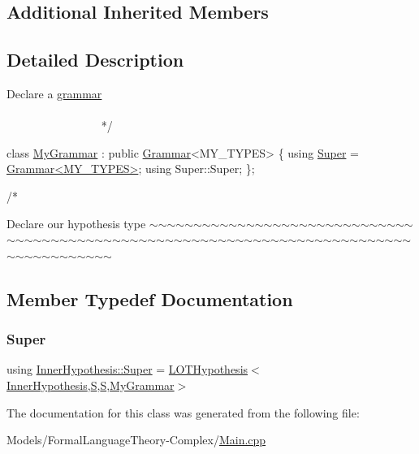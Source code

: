 \subsection*{Additional Inherited Members}


\subsection{Detailed Description}

\begin{DoxyCode}
    Declare a \hyperlink{class_l_o_t_hypothesis_affae32db28c39df676809ae47e14e7cf}{grammar}
   ~~~~~~~~~~~~~~~~~~~~~~~~~~~~~~~~~~~~~~~~~~~~~~~~~~~~~~~~~~~~~~~~~~~~~~~~~~~~~~~~~~~~~~~~ */



\textcolor{keyword}{class }\hyperlink{class_my_grammar}{MyGrammar} : \textcolor{keyword}{public} \hyperlink{class_grammar}{Grammar}<MY\_TYPES> \{
    \textcolor{keyword}{using} \hyperlink{class_inner_hypothesis_a1a69a8dd433b64b725be0b2436d6df0c}{Super} = \hyperlink{class_grammar}{Grammar<MY\_TYPES>};
    \textcolor{keyword}{using} Super::Super;
\};

\textcolor{comment}{/*}
\end{DoxyCode}
 Declare our hypothesis type $\sim$$\sim$$\sim$$\sim$$\sim$$\sim$$\sim$$\sim$$\sim$$\sim$$\sim$$\sim$$\sim$$\sim$$\sim$$\sim$$\sim$$\sim$$\sim$$\sim$$\sim$$\sim$$\sim$$\sim$$\sim$$\sim$$\sim$$\sim$$\sim$$\sim$$\sim$$\sim$$\sim$$\sim$$\sim$$\sim$$\sim$$\sim$$\sim$$\sim$$\sim$$\sim$$\sim$$\sim$$\sim$$\sim$$\sim$$\sim$$\sim$$\sim$$\sim$$\sim$$\sim$$\sim$$\sim$$\sim$$\sim$$\sim$$\sim$$\sim$$\sim$$\sim$$\sim$$\sim$$\sim$$\sim$$\sim$$\sim$$\sim$$\sim$$\sim$$\sim$$\sim$$\sim$$\sim$$\sim$$\sim$$\sim$$\sim$$\sim$$\sim$$\sim$$\sim$$\sim$$\sim$$\sim$$\sim$$\sim$ 

\subsection{Member Typedef Documentation}
\mbox{\label{class_inner_hypothesis_a1a69a8dd433b64b725be0b2436d6df0c}} 
\subsubsection{\texorpdfstring{Super}{Super}}
{\footnotesize\ttfamily using \hyperlink{class_inner_hypothesis_a1a69a8dd433b64b725be0b2436d6df0c}{Inner\+Hypothesis\+::\+Super} =  \hyperlink{class_l_o_t_hypothesis}{L\+O\+T\+Hypothesis}$<$\hyperlink{class_inner_hypothesis}{Inner\+Hypothesis},\hyperlink{_models_2_formal_language_theory-_complex_2main_8cpp_a51c40915539205f0b5add30b0d68a4cb}{S},\hyperlink{_models_2_formal_language_theory-_complex_2main_8cpp_a51c40915539205f0b5add30b0d68a4cb}{S},\hyperlink{class_my_grammar}{My\+Grammar}$>$}



The documentation for this class was generated from the following file\+:\begin{DoxyCompactItemize}
\item 
Models/\+Formal\+Language\+Theory-\/\+Complex/\hyperlink{_models_2_formal_language_theory-_complex_2main_8cpp}{Main.\+cpp}\end{DoxyCompactItemize}

